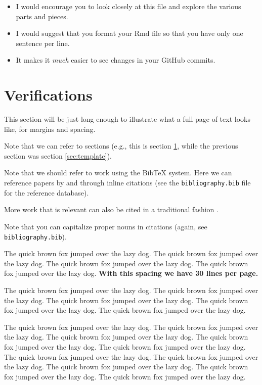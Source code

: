 \documentclass[12pt]{article}
\providecommand{\tightlist}{%
  \setlength{\itemsep}{0pt}\setlength{\parskip}{0pt}}
\begin{document}
\begin{itemize}
\tightlist
\item
  I would encourage you to look closely at this file and explore the
  various parts and pieces.
\item
  I would suggest that you format your Rmd file so that you have only
  one sentence per line.
\item
  It makes it \emph{much} easier to see changes in your GitHub commits.
\end{itemize}

\section{Verifications}
\label{sec:verify}

This section will be just long enough to illustrate what a full page of
text looks like, for margins and spacing.

Note that we can refer to sections (e.g., this is section
\ref{sec:verify}, while the previous section was section
\ref{sec:template}).

Note that we should refer to work using the BibTeX system. Here we can
reference papers by \citet{Campbell02} and \citet{Schubert13} through
inline citations (see the \texttt{bibliography.bib} file for the
reference database).

More work that is relevant can also be cited in a traditional fashion
\citep[\citet{Galyardt14mmm},\citet{Galyardt12dis}]{Chi81}.

Note that you can capitalize proper nouns in citations
\citep{Campbell02} (again, see \texttt{bibliography.bib}).

The quick brown fox jumped over the lazy dog. The quick brown fox jumped
over the lazy dog. The quick brown fox jumped over the lazy dog. The
quick brown fox jumped over the lazy dog. \textbf{With this spacing we
have 30 lines per page.}

The quick brown fox jumped over the lazy dog. The quick brown fox jumped
over the lazy dog. The quick brown fox jumped over the lazy dog. The
quick brown fox jumped over the lazy dog. The quick brown fox jumped
over the lazy dog.

The quick brown fox jumped over the lazy dog. The quick brown fox jumped
over the lazy dog. The quick brown fox jumped over the lazy dog. The
quick brown fox jumped over the lazy dog. The quick brown fox jumped
over the lazy dog. The quick brown fox jumped over the lazy dog. The
quick brown fox jumped over the lazy dog. The quick brown fox jumped
over the lazy dog. The quick brown fox jumped over the lazy dog. The
quick brown fox jumped over the lazy dog.
\end{document}
